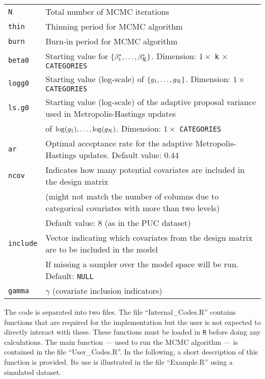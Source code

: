 \documentclass[a4paper,11pt]{article}
\newcommand{\azul}{\color{blue}}
\theoremstyle{example}
\theoremstyle{theorem}
\theoremstyle{theorem}
\theoremstyle{proposition}
\theoremstyle{corollary}
\begin{document}
\begin{table}[H]
\begin{tabular}{ll}
  \texttt{N}       & Total number of MCMC iterations \\
  \texttt{thin}    & Thinning period for MCMC algorithm \\
  \texttt{burn}    & Burn-in period for MCMC algorithm \\
  \texttt{beta0}        & Starting value for $\{\beta^*_1,\ldots,\beta^*_{\cal R}\}$. Dimension: $1 \times$ \texttt{k} $\times$ \texttt{CATEGORIES} \\
  \texttt{logg0}        & Starting value (log-scale) of $\{g_1,\ldots,g_{\cal R}\}$. Dimension: $1 \times$  \texttt{CATEGORIES}\\
  \texttt{ls.g0}        & Starting value (log-scale) of the adaptive proposal variance used in Metropolis-Hastings updates  \\
                        & of $\log(g_1),\ldots,\log(g_{\cal R})$. Dimension: $1 \times$ \texttt{CATEGORIES}\\
  \texttt{ar}           & Optimal acceptance rate for the adaptive Metropolis-Hastings updates. Default value: 0.44 \\
 \texttt{ncov} & Indicates how many potential covariates are included in the design matrix \\ 
 &  (might not match the number of columns due to categorical covariates with more than two levels)   \\
&  Default value: 8 (as in the PUC dataset) \\
 \texttt{include} & Vector indicating which covariates from the design matrix are to be included in the model \\
&  If missing a sampler over the model space will be run. Default:  \texttt{NULL} \\
 \texttt{gamma} &  $\gamma$ (covariate inclusion indicators) \\
\end{tabular}
\end{table}


The code is separated into two files. The file ``Internal\_Codes.R'' contains functions that are required for the implementation but the user is not expected to directly interact with these. These functions must be loaded in \texttt{R} before doing any calculations. The main function --- used to run the MCMC algorithm --- is contained in the file ``User\_Codes.R''. In the following, a short description of this function is provided. Its use is illustrated in the file ``Example.R'' using a simulated dataset.
\end{document}
